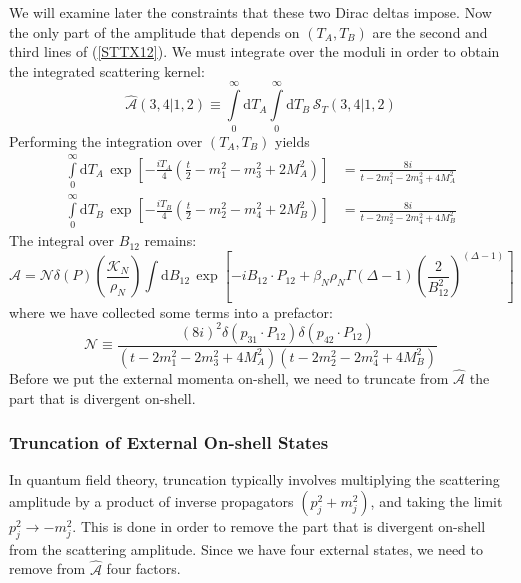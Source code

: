 We will examine later the constraints that these two Dirac deltas impose. Now the only part of the amplitude that depends on $(T_{A}, T_{B})$ are the second and third lines of (\ref{STTX12}). We must integrate over the moduli in order to obtain the integrated scattering kernel:
\begin{equation}
	\widehat{\mathcal{A}}(3, 4| 1, 2) \equiv \int\limits_{0}^{\infty} \mathrm{d}T_{A} \int\limits_{0}^{\infty} \mathrm{d}T_{B} \, \mathcal{S}_{T}(3, 4| 1, 2)
\end{equation}
Performing the integration over $(T_{A}, T_{B})$ yields
\begin{align}
	\int\limits_{0}^{\infty} \mathrm{d}T_{A} \, \exp{\left[ -\frac{i T_{A}}{4} \left( \frac{t}{2} - m_{1}^{2} - m_{3}^{2} + 2 M_{A}^{2}\right) \right]} &= \frac{8i}{t - 2m_{1}^{2} - 2m_{3}^{2} + 4 M_{A}^{2}} \\
	\int\limits_{0}^{\infty} \mathrm{d}T_{B} \, \exp{\left[ -\frac{i T_{B}}{4} \left( \frac{t}{2} - m_{2}^{2} - m_{4}^{2} + 2 M_{B}^{2}\right) \right]} &= \frac{8i}{t - 2m_{2}^{2} - 2m_{4}^{2} + 4 M_{B}^{2}}
\end{align}
The integral over $B_{12}$ remains:
\begin{equation}
	\widehat{\mathcal{A}} = \mathcal{N} \delta(P) \left( \frac{\mathcal{K}_{N}}{\rho_{N}} \right) \int \mathrm{d}B_{12} \, \exp{\left[-i B_{12} \cdot P_{12} + \beta_{N} \rho_{N} \Gamma(\Delta - 1) \left( \frac{2}{B_{1 2}^{2}} \right)^{(\Delta - 1)} \right]} \label{AHatN}
\end{equation}
where we have collected some terms into a prefactor:
\begin{equation}
	\mathcal{N} \equiv \frac{(8i)^{2} \delta(p_{31} \cdot P_{12}) \delta(p_{42} \cdot P_{12})}{(t - 2m_{1}^{2} - 2m_{3}^{2} + 4 M_{A}^{2})(t - 2m_{2}^{2} - 2m_{4}^{2} + 4 M_{B}^{2})}
\end{equation}
Before we put the external momenta on-shell, we need to truncate from $\widehat{\mathcal{A}}$ the part that is divergent on-shell.
\subsubsection{Truncation of External On-shell States}
In quantum field theory, truncation typically involves multiplying the scattering amplitude by a product of inverse propagators $(p_{j}^{2} + m_{j}^{2})$, and taking the limit $p_{j}^{2} \rightarrow - m_{j}^{2}$. This is done in order to remove the part that is divergent on-shell from the scattering amplitude. Since we have four external states, we need to remove from $\widehat{\mathcal{A}}$ four factors.


